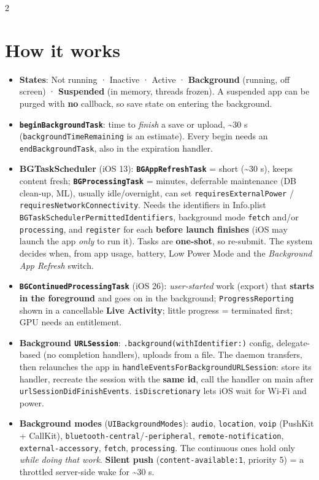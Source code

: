 \documentclass[8pt]{extarticle}
\begin{document}
\begin{multicols}{2}
\raggedright

\section{How it works}
\begin{itemize}
  \item \textbf{States}: Not running · Inactive · Active · \textbf{Background}
        (running, off screen) · \textbf{Suspended} (in memory, threads frozen).
        A suspended app can be purged with \textbf{no} callback, so save state
        on entering the background.
  \item \textbf{\texttt{beginBackgroundTask}}: time to \emph{finish} a save
        or upload, \textasciitilde30 s (\texttt{backgroundTimeRemaining} is an
        estimate). Every begin needs an \texttt{endBackgroundTask}, also in the
        expiration handler.
  \item \textbf{BGTaskScheduler} (iOS 13):
        \textbf{\texttt{BGAppRefreshTask}} = short (\textasciitilde30 s),
        keeps content fresh; \textbf{\texttt{BGProcessingTask}} = minutes,
        deferrable maintenance (DB clean-up, ML), usually idle/overnight, can
        set \texttt{requiresExternalPower} / \texttt{requiresNetworkConnectivity}.
        Needs the identifiers in Info.plist
        \texttt{BGTaskSchedulerPermittedIdentifiers}, background mode
        \texttt{fetch} and/or \texttt{processing}, and \texttt{register} for
        each \textbf{before launch finishes} (iOS may launch the app \emph{only} to run
        it). Tasks are \textbf{one-shot}, so re-submit.
        The system decides when, from app usage, battery, Low Power Mode and
        the \emph{Background App Refresh} switch.
  \item \textbf{\texttt{BGContinuedProcessingTask}} (iOS 26): \emph{user-started} work
        (export) that \textbf{starts in the foreground} and goes on in the background;
        \texttt{ProgressReporting} shown in a cancellable \textbf{Live Activity};
        little progress = terminated first; GPU needs an entitlement.
  \item \textbf{Background \texttt{URLSession}}:
        \texttt{.background(withIdentifier:)} config, delegate-based (no
        completion handlers), uploads from a file. The daemon transfers, then
        relaunches the app in \texttt{handleEventsForBackgroundURLSession}:
        store its handler, recreate the session with the \textbf{same id}, call
        the handler on main after \texttt{urlSessionDidFinishEvents}.
        \texttt{isDiscretionary} lets iOS wait for Wi-Fi and power.
  \item \textbf{Background modes} (\texttt{UIBackgroundModes}):
        \texttt{audio}, \texttt{location}, \texttt{voip} (PushKit + CallKit),
        \texttt{bluetooth-central}/\texttt{-peripheral},
        \texttt{remote-notification}, \texttt{external-accessory},
        \texttt{fetch}, \texttt{processing}. The continuous ones hold only
        \emph{while doing that work}. \textbf{Silent push}
        (\texttt{content-available:1}, priority 5) = a throttled server-side
        wake for \textasciitilde30 s.
\end{itemize}


\end{multicols}
\end{document}

